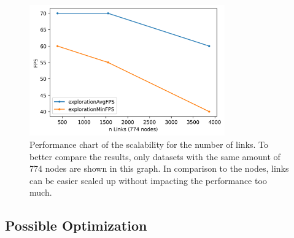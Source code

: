 \begin{figure}[!hbt]
    \centering
    \includegraphics[width=0.75\textwidth]{graphics/performanceAnalysisLinks2.png}
    \caption[Performance chart of the scalability for the number of links.]{Performance chart of the scalability for the number of links. To better compare the results, only datasets with the same amount of 774 nodes are shown in this graph. In comparison to the nodes, links can be easier scaled up without impacting the performance too much.} 
    \label{fig:performanceLinks} 
\end{figure}
\pagebreak
\subsection{Possible Optimization}

